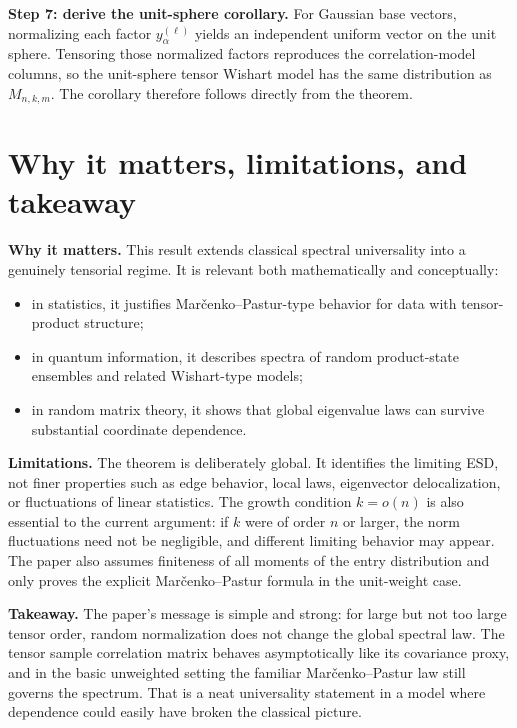 \documentclass[11pt]{article}
\begin{document}
\textbf{Step 7: derive the unit-sphere corollary.}
For Gaussian base vectors, normalizing each factor $y_\alpha^{(\ell)}$ yields an independent uniform vector on the unit sphere. Tensoring those normalized factors reproduces the correlation-model columns, so the unit-sphere tensor Wishart model has the same distribution as $M_{n,k,m}$. The corollary therefore follows directly from the theorem.

\section*{Why it matters, limitations, and takeaway}
\textbf{Why it matters.}
This result extends classical spectral universality into a genuinely tensorial regime. It is relevant both mathematically and conceptually:
\begin{itemize}
    \item in statistics, it justifies Mar\v cenko--Pastur-type behavior for data with tensor-product structure;
    \item in quantum information, it describes spectra of random product-state ensembles and related Wishart-type models;
    \item in random matrix theory, it shows that global eigenvalue laws can survive substantial coordinate dependence.
\end{itemize}

\textbf{Limitations.}
The theorem is deliberately global. It identifies the limiting ESD, not finer properties such as edge behavior, local laws, eigenvector delocalization, or fluctuations of linear statistics. The growth condition $k=o(n)$ is also essential to the current argument: if $k$ were of order $n$ or larger, the norm fluctuations need not be negligible, and different limiting behavior may appear. The paper also assumes finiteness of all moments of the entry distribution and only proves the explicit Mar\v cenko--Pastur formula in the unit-weight case.

\textbf{Takeaway.}
The paper's message is simple and strong: for large but not too large tensor order, random normalization does not change the global spectral law. The tensor sample correlation matrix behaves asymptotically like its covariance proxy, and in the basic unweighted setting the familiar Mar\v cenko--Pastur law still governs the spectrum. That is a neat universality statement in a model where dependence could easily have broken the classical picture.
\end{document}
